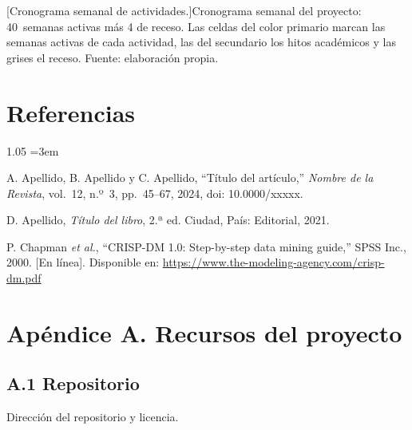 \documentclass[12pt,letterpaper]{report}
\newcommand{\cita}[1]{\hyperref[bib:#1]{[#1]}}
\begin{document}
\begin{landscape}
\begin{minipage}[c][\textheight][c]{\linewidth}
{\begin{tabular}{|>{\raggedright\arraybackslash}p{4.6cm}|*{10}{cccc|}}
    \end{tabular}%
}%
\captionsetup{hypcap=false}
[Cronograma semanal de actividades.]{Cronograma semanal del proyecto: 40~semanas activas más 4 de receso. Las celdas del color primario marcan las semanas activas de cada actividad, las del secundario los hitos académicos y las grises el receso. Fuente: elaboración propia.}
\label{tab:cronograma}
\end{minipage}
\end{landscape}
\clearpage

\chapter{Referencias}
\begin{spacing}{1.05}
\footnotesize
\sloppy
{}
\emergencystretch=3em
\begin{enumerate}[label={[\arabic*]}, leftmargin=0.9cm, labelsep=0.3cm, itemsep=4pt, parsep=0pt, topsep=0pt]
    \item \label{bib:1} A. Apellido, B. Apellido y C. Apellido, ``Título del artículo,'' \textit{Nombre de la Revista}, vol.~12, n.º~3, pp.~45--67, 2024, doi: 10.0000/xxxxx.
    \item \label{bib:2} D. Apellido, \textit{Título del libro}, 2.ª ed. Ciudad, País: Editorial, 2021.
    \item \label{bib:3} P. Chapman \textit{et al.}, ``CRISP-DM 1.0: Step-by-step data mining guide,'' SPSS Inc., 2000. [En línea]. Disponible en: \url{https://www.the-modeling-agency.com/crisp-dm.pdf}
\end{enumerate}
\end{spacing}

\chapter*{Apéndice A. Recursos del proyecto}

\section*{A.1 Repositorio}
Dirección del repositorio y licencia.
\end{document}
